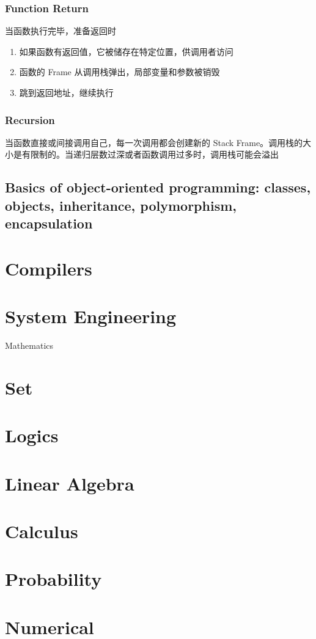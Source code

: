 \documentclass[11pt,journal,compsoc]{IEEEtran}
\begin{document}
\subsubsection{Function Return}

当函数执行完毕，准备返回时

\begin{enumerate}
    \item 如果函数有返回值，它被储存在特定位置，供调用者访问
    \item 函数的 Frame 从调用栈弹出，局部变量和参数被销毁
    \item 跳到返回地址，继续执行
\end{enumerate}


\subsubsection{Recursion}

当函数直接或间接调用自己，每一次调用都会创建新的 Stack Frame。调用栈的大小是有限制的。当递归层数过深或者函数调用过多时，调用栈可能会溢出


\subsection{Basics of object-oriented programming: classes, objects, inheritance, polymorphism, encapsulation}




\section{Compilers}


\section{System Engineering}


Mathematics


\section{Set}


\section{Logics}


\section{Linear Algebra}


\section{Calculus}


\section{Probability}


\section{Numerical}
\end{document}
